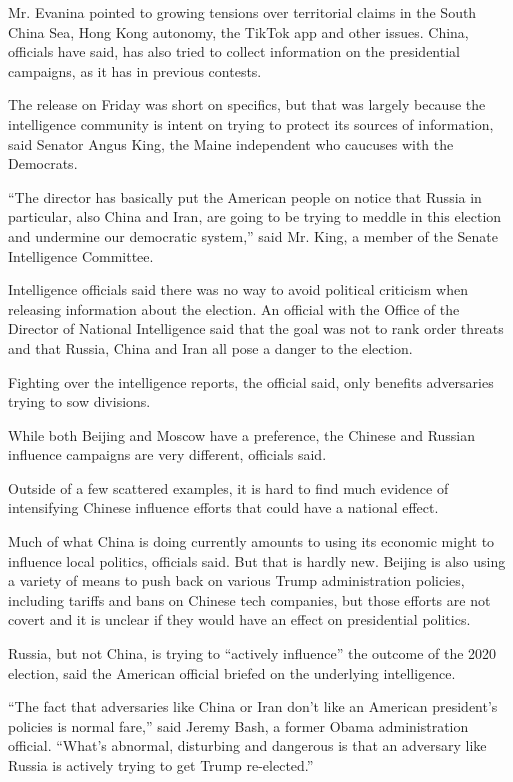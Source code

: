 Mr. Evanina pointed to growing tensions over territorial claims in the
South China Sea, Hong Kong autonomy, the TikTok app and other issues.
China, officials have said, has also tried to collect information on the
presidential campaigns, as it has in previous contests.

The release on Friday was short on specifics, but that was largely
because the intelligence community is intent on trying to protect its
sources of information, said Senator Angus King, the Maine independent
who caucuses with the Democrats.

``The director has basically put the American people on notice that
Russia in particular, also China and Iran, are going to be trying to
meddle in this election and undermine our democratic system,'' said Mr.
King, a member of the Senate Intelligence Committee.

Intelligence officials said there was no way to avoid political
criticism when releasing information about the election. An official
with the Office of the Director of National Intelligence said that the
goal was not to rank order threats and that Russia, China and Iran all
pose a danger to the election.

Fighting over the intelligence reports, the official said, only benefits
adversaries trying to sow divisions.

While both Beijing and Moscow have a preference, the Chinese and Russian
influence campaigns are very different, officials said.

Outside of a few scattered examples, it is hard to find much evidence of
intensifying Chinese influence efforts that could have a national
effect.

Much of what China is doing currently amounts to using its economic
might to influence local politics, officials said. But that is hardly
new. Beijing is also using a variety of means to push back on various
Trump administration policies, including tariffs and bans on Chinese
tech companies, but those efforts are not covert and it is unclear if
they would have an effect on presidential politics.

Russia, but not China, is trying to ``actively influence'' the outcome
of the 2020 election, said the American official briefed on the
underlying intelligence.

``The fact that adversaries like China or Iran don't like an American
president's policies is normal fare,'' said Jeremy Bash, a former Obama
administration official. ``What's abnormal, disturbing and dangerous is
that an adversary like Russia is actively trying to get Trump
re-elected.''

